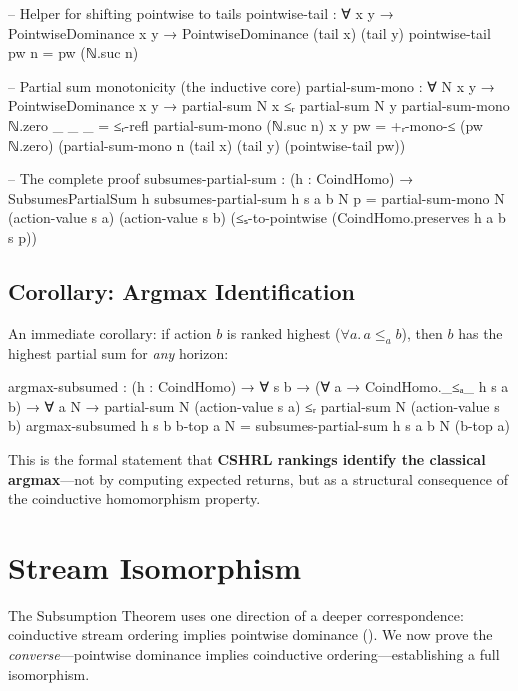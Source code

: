 \documentclass[9pt,a4paper]{article}
\theoremstyle{plain}
\theoremstyle{definition}
\theoremstyle{remark}
\begin{document}
\begin{code}
  -- Helper for shifting pointwise to tails
  pointwise-tail : ∀ {x y} → PointwiseDominance x y → 
                   PointwiseDominance (tail x) (tail y)
  pointwise-tail pw n = pw (ℕ.suc n)

  -- Partial sum monotonicity (the inductive core)
  partial-sum-mono : ∀ N x y → PointwiseDominance x y → 
                     partial-sum N x ≤ᵣ partial-sum N y
  partial-sum-mono ℕ.zero _ _ _ = ≤ᵣ-refl
  partial-sum-mono (ℕ.suc n) x y pw = 
    +ᵣ-mono-≤ (pw ℕ.zero) 
              (partial-sum-mono n (tail x) (tail y) (pointwise-tail pw))

  -- The complete proof
  subsumes-partial-sum : (h : CoindHomo) → SubsumesPartialSum h
  subsumes-partial-sum h s a b N p = 
    partial-sum-mono N (action-value s a) (action-value s b) 
                     (≤ₛ-to-pointwise (CoindHomo.preserves h a b s p))
\end{code}

\subsection{Corollary: Argmax Identification}

An immediate corollary: if action $b$ is ranked highest ($\forall a.\, a \le_a b$), then $b$ has the highest partial sum for \emph{any} horizon:

\begin{code}
  argmax-subsumed : (h : CoindHomo) → ∀ s b →
    (∀ a → CoindHomo._≤ₐ_ h s a b) →
    ∀ a N → partial-sum N (action-value s a) ≤ᵣ partial-sum N (action-value s b)
  argmax-subsumed h s b b-top a N = subsumes-partial-sum h s a b N (b-top a)
\end{code}

This is the formal statement that \textbf{CSHRL rankings identify the classical argmax}---not by computing expected returns, but as a structural consequence of the coinductive homomorphism property.

\section{Stream Isomorphism}
\label{sec:iso}

The Subsumption Theorem uses one direction of a deeper correspondence: coinductive stream ordering implies pointwise dominance ().  We now prove the \emph{converse}---pointwise dominance implies coinductive ordering---establishing a full isomorphism.
\end{document}
